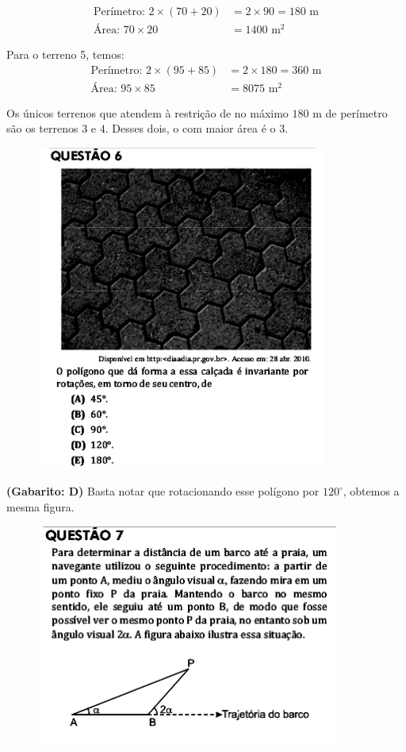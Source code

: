 \documentclass[a4paper]{article}
\begin{document}
\begin{align*}
\text{Perímetro: }2\times (70+20) &= 2\times 90 = 180\text{ m} \\
\text{Área: } 70\times 20 &= 1400\text{ m}^2
\end{align*}\par\vspace{0.3cm} Para o terreno 5, temos:
\begin{align*}
\text{Perímetro: }2\times (95+85) &= 2\times 180 = 360\text{ m} \\
\text{Área: } 95\times 85 &= 8075\text{ m}^2
\end{align*}
\par\vspace{0.3cm} Os únicos terrenos que atendem à restrição de no máximo $180$ m de perímetro são os terrenos $3$ e $4$. Desses dois, o com maior área é o 3.
\begin{figure}[H]
	\begin{center}
		\includegraphics[width=9.5cm]{L5Q6.png}
	\end{center}
\end{figure}
\par\textbf{(Gabarito: D)} Basta notar que rotacionando esse polígono por $120^\circ$, obtemos a mesma figura.
\begin{figure}[H]
	\begin{center}
		\includegraphics[width=10cm]{L5Q7_1.png}
	\end{center}
\end{figure}
\end{document}
